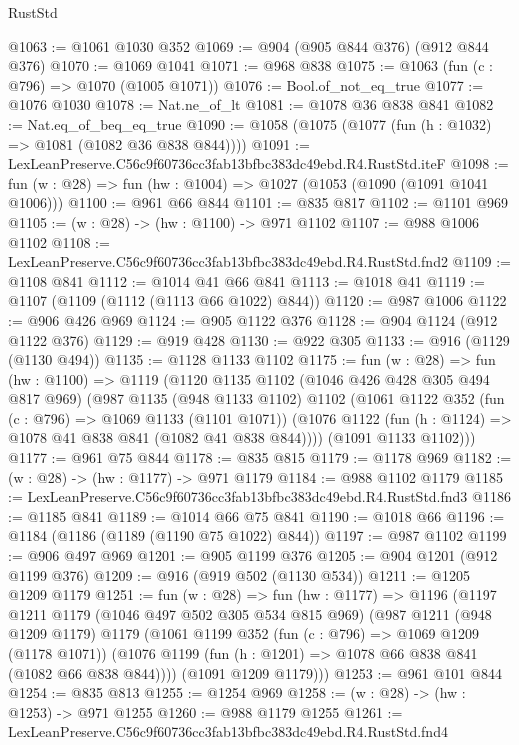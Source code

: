 \begin{lexlean}{RustStd}
\begin{coremodule}
@1063 := @1061 @1030 @352
@1069 := @904 (@905 @844 @376) (@912 @844 @376)
@1070 := @1069 @1041
@1071 := @968 @838
@1075 := @1063 (fun (c : @796) => @1070 (@1005 @1071))
@1076 := Bool.of_not_eq_true
@1077 := @1076 @1030
@1078 := Nat.ne_of_lt
@1081 := @1078 @36 @838 @841
@1082 := Nat.eq_of_beq_eq_true
@1090 := @1058 (@1075 (@1077 (fun (h : @1032) => @1081 (@1082 @36 @838 @844))))
@1091 := LexLeanPreserve.C56c9f60736cc3fab13bfbc383dc49ebd.R4.RustStd.iteF
@1098 := fun (w : @28) => fun (hw : @1004) => @1027 (@1053 (@1090 (@1091 @1041 @1006)))
@1100 := @961 @66 @844
@1101 := @835 @817
@1102 := @1101 @969
@1105 := (w : @28) -> (hw : @1100) -> @971 @1102
@1107 := @988 @1006 @1102
@1108 := LexLeanPreserve.C56c9f60736cc3fab13bfbc383dc49ebd.R4.RustStd.fnd2
@1109 := @1108 @841
@1112 := @1014 @41 @66 @841
@1113 := @1018 @41
@1119 := @1107 (@1109 (@1112 (@1113 @66 @1022) @844))
@1120 := @987 @1006
@1122 := @906 @426 @969
@1124 := @905 @1122 @376
@1128 := @904 @1124 (@912 @1122 @376)
@1129 := @919 @428
@1130 := @922 @305
@1133 := @916 (@1129 (@1130 @494))
@1135 := @1128 @1133 @1102
@1175 := fun (w : @28) =>
  fun (hw : @1100) =>
  @1119
    (@1120
      @1135
      @1102
      (@1046 @426 @428 @305 @494 @817 @969)
      (@987
        @1135
        (@948 @1133 @1102)
        @1102
        (@1061
          @1122
          @352
          (fun (c : @796) => @1069 @1133 (@1101 @1071))
          (@1076 @1122 (fun (h : @1124) => @1078 @41 @838 @841 (@1082 @41 @838 @844))))
        (@1091 @1133 @1102)))
@1177 := @961 @75 @844
@1178 := @835 @815
@1179 := @1178 @969
@1182 := (w : @28) -> (hw : @1177) -> @971 @1179
@1184 := @988 @1102 @1179
@1185 := LexLeanPreserve.C56c9f60736cc3fab13bfbc383dc49ebd.R4.RustStd.fnd3
@1186 := @1185 @841
@1189 := @1014 @66 @75 @841
@1190 := @1018 @66
@1196 := @1184 (@1186 (@1189 (@1190 @75 @1022) @844))
@1197 := @987 @1102
@1199 := @906 @497 @969
@1201 := @905 @1199 @376
@1205 := @904 @1201 (@912 @1199 @376)
@1209 := @916 (@919 @502 (@1130 @534))
@1211 := @1205 @1209 @1179
@1251 := fun (w : @28) =>
  fun (hw : @1177) =>
  @1196
    (@1197
      @1211
      @1179
      (@1046 @497 @502 @305 @534 @815 @969)
      (@987
        @1211
        (@948 @1209 @1179)
        @1179
        (@1061
          @1199
          @352
          (fun (c : @796) => @1069 @1209 (@1178 @1071))
          (@1076 @1199 (fun (h : @1201) => @1078 @66 @838 @841 (@1082 @66 @838 @844))))
        (@1091 @1209 @1179)))
@1253 := @961 @101 @844
@1254 := @835 @813
@1255 := @1254 @969
@1258 := (w : @28) -> (hw : @1253) -> @971 @1255
@1260 := @988 @1179 @1255
@1261 := LexLeanPreserve.C56c9f60736cc3fab13bfbc383dc49ebd.R4.RustStd.fnd4

\end{coremodule}
\end{lexlean}
